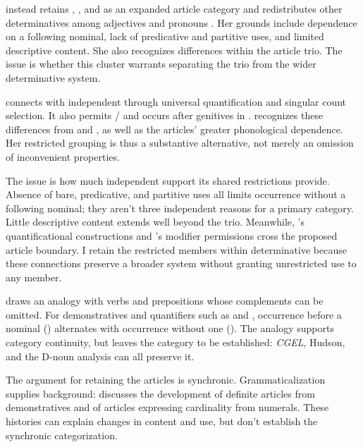 \documentclass[12pt]{article}
\begin{document}
\textcite[153--158]{spinillo2004reconceptualising} instead retains , , and  as an expanded article category and redistributes other determinatives among adjectives and pronouns \citep[194--195]{spinillo2004reconceptualising}. Her grounds include dependence on a following nominal, lack of predicative and partitive uses, and limited descriptive content. She also recognizes differences within the article trio. The issue is whether this cluster warrants separating the trio from the wider determinative system.

 connects with independent  through universal quantification and singular count selection. It also permits / and occurs after genitives in . \textcite[156--158]{spinillo2004reconceptualising} recognizes these differences from  and , as well as the articles' greater phonological dependence. Her restricted grouping is thus a substantive alternative, not merely an omission of inconvenient properties.

The issue is how much independent support its shared restrictions provide. Absence of bare, predicative, and partitive uses all limits occurrence without a following nominal; they aren't three independent reasons for a primary category. Little descriptive content extends well beyond the trio. Meanwhile, 's quantificational constructions and 's modifier permissions cross the proposed article boundary. I retain the restricted members within determinative because these connections preserve a broader system without granting unrestricted use to any member.

\textcite[140--144]{spinillo2004reconceptualising} draws an analogy with verbs and prepositions whose complements can be omitted. For demonstratives and quantifiers such as  and , occurrence before a nominal () alternates with occurrence without one (). The analogy supports category continuity, but leaves the category to be established: \textit{CGEL}, Hudson, and the D-noun analysis can all preserve it.

The argument for retaining the articles is synchronic. Grammaticalization supplies background: \textcite[331--336]{lyons1999} discusses the development of definite articles from demonstratives and of articles expressing cardinality from numerals. These histories can explain changes in content and use, but don't establish the synchronic categorization.
\end{document}
